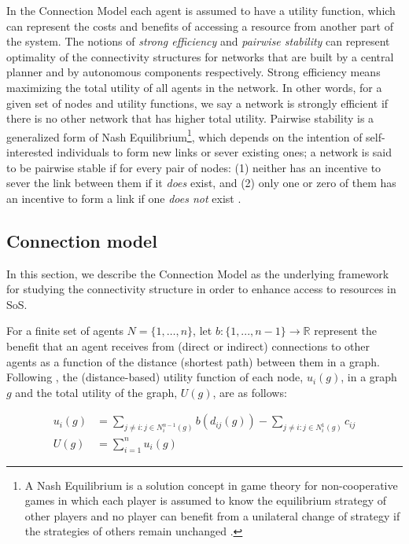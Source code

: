 \documentclass[journal,onecolumn]{IEEEtran}
\theoremstyle{plain}
\begin{document}
In the Connection Model each agent is assumed to have a utility function, which can represent the costs and benefits of accessing a resource from another part of the system. The notions of \textit{strong efficiency} and \textit{pairwise stability} can represent optimality of the connectivity structures for networks that are built by a central planner and by autonomous components respectively. Strong efficiency means maximizing the total utility of all agents in the network. In other words, for a given set of nodes and utility functions, we say a network is strongly efficient if there is no other network that has higher total utility. Pairwise stability is a generalized form of Nash Equilibrium\footnote{A Nash Equilibrium is a solution concept in game theory for non-cooperative games in which each player is assumed to know the equilibrium strategy of other players and no player can benefit from a unilateral change of strategy if the strategies of others remain unchanged \citep{osborne1994course}.}, which depends on the intention of self-interested individuals to form new links or sever existing ones; a network is said to be pairwise stable if for every pair of nodes: (1) neither has an incentive to sever the link between them if it \textit{does} exist, and (2) only one or zero of them has an incentive to form a link if one \textit{does not} exist \citep{jackson1996strategic}.

\subsection{Connection model}

In this section, we describe the Connection Model as the underlying framework for studying the connectivity structure in order to enhance access to resources in SoS.

For a finite set of agents 
$N=\{1, \dots, n\}$, let $b:\{1, ... ,n-1\} \rightarrow \mathbb{R}$ 
represent the benefit that an agent receives from (direct or indirect) connections to other agents as a function of the distance (shortest path) between them in a graph. Following \cite{jackson1996strategic}, the (distance-based) utility function of each node, $u_i(g)$, in a graph $g$ and the total utility of the graph, $U(g)$, are as follows:

\begin{equation} 
\label{utility_connection_model}
\begin{split}
u_i(g)&=\sum_{j\neq i: j\in N_i^{n-1}(g)} b(d_{ij}(g))-\sum_{j\neq i: j\in N^1_i(g) } c_{ij}\\
U(g)&=\sum_{i=1}^{n}u_i(g)
\end{split}
\end{equation} 
\end{document}

